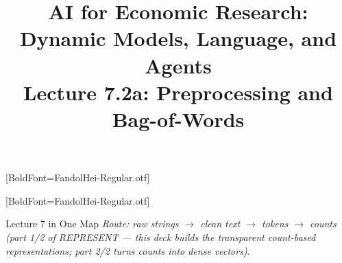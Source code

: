 


\usepackage{iftex}
\ifluatex
  \usepackage{luatexja-fontspec}
  \setmainfont{Latin Modern Roman}%
  \setsansfont{Latin Modern Sans}%
  \setmonofont{Latin Modern Mono}%
  [BoldFont=FandolHei-Regular.otf]%
  \newcommand{\zhterm}[2]{#1}%
\else\ifxetex
  \usepackage{fontspec}
  \setmainfont{Latin Modern Roman}%
  \setsansfont{Latin Modern Sans}%
  \setmonofont{Latin Modern Mono}%
  \usepackage{xeCJK}
  [BoldFont=FandolHei-Regular.otf]%
  \newcommand{\zhterm}[2]{#1}%
\else
  \newcommand{\zhterm}[2]{#2}%
\fi\fi


\graphicspath{{./pic/}{../../MiniCourse_8hr/Slides/Module3_LLM_Text/pic/}{../}}

\usetikzlibrary{arrows.meta,positioning,shapes,calc,fit,backgrounds}



\title[AI for Econ Research]{AI for Economic Research: Dynamic Models, Language, and Agents\\
Lecture 7.2a: Preprocessing and Bag-of-Words}



\makebeamertitle

\begin{frame}{Lecture 7 in One Map}
\medskip
\textit{\footnotesize Route: raw strings $\to$ clean text $\to$ tokens $\to$ counts (part 1/2 of REPRESENT --- this deck builds the transparent count-based representations; part 2/2 turns counts into dense vectors).}
\end{frame}

